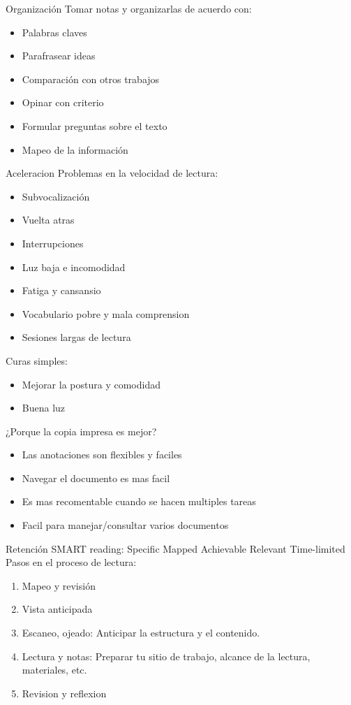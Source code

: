 \documentclass[
10pt,
aspectratio=169,
]{beamer}
\begin{document}
\begin{frame}[c]{Organizaci\'on}
Tomar notas y organizarlas de acuerdo con:
\begin{itemize}
\item Palabras claves
\item Parafrasear ideas
\item Comparaci\'on con otros trabajos
\item Opinar con criterio
\item Formular preguntas sobre el texto
\item Mapeo de la informaci\'on
\end{itemize}
\end{frame}

\begin{frame}[c]{Aceleracion}
Problemas en la velocidad de lectura:
\begin{itemize}
\item Subvocalizaci\'on
\item Vuelta atras
\item Interrupciones
\item Luz baja e incomodidad
\item Fatiga y cansansio
\item Vocabulario pobre y mala comprension
\item Sesiones largas de lectura
\end{itemize}
Curas simples:
\begin{itemize}
\item Mejorar la postura y comodidad
\item Buena luz
\end{itemize}
\end{frame}


\begin{frame}[c]{¿Porque la copia impresa es mejor?}
\begin{itemize}
\item Las anotaciones son flexibles y faciles
\item Navegar el documento es mas facil
\item Es mas recomentable cuando se hacen multiples tareas
\item Facil para manejar/consultar varios documentos
\end{itemize}
\end{frame}

\begin{frame}[c]{Retenci\'on}
\alert{SMART} reading:
\alert{S}pecific \alert{M}apped \alert{A}chievable  \alert{R}elevant \alert{T}ime-limited 
Pasos en el proceso de lectura:
\begin{enumerate}
\item Mapeo y revisi\'on
\item Vista anticipada
\item Escaneo, ojeado: Anticipar la estructura y el contenido.
\item Lectura y notas: Preparar tu sitio de trabajo, alcance de la lectura, materiales, etc.
\item Revision y reflexion
\end{enumerate}
\end{frame}
\end{document}
